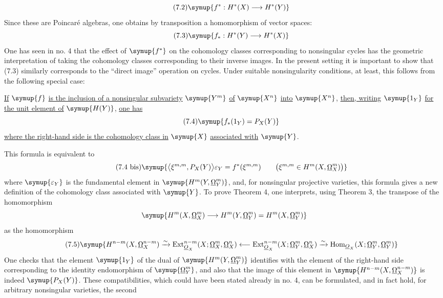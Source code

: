 \begin{equation}\tag{7.2}
  \symup{f^{*}:H^{*}(X)\longrightarrow H^{*}(Y)}
\end{equation}
Since these are Poincaré algebras, one obtains by transposition a homomorphism of vector
spaces:
\begin{equation}\tag{7.3}
  \symup{f_{*}:H^{*}(Y)\longrightarrow H^{*}(X)}
\end{equation}
One has seen in no. 4 that the effect of $\symup{f^{*}}$ on the cohomology classes
corresponding to nonsingular cycles has the geometric interpretation of taking
the cohomology classes corresponding to their inverse images. In the present
setting it is important to show that (7.3) similarly corresponds to the
``direct image'' operation on cycles. Under suitable nonsingularity conditions,
at least, this follows from the following special case:

 \uline{If} $\symup{f}$ \uline{is the inclusion of a nonsingular subvariety} $\symup{Y^{m}}$
\uline{of} $\symup{X^{n}}$ \uline{into} $\symup{X^{n}}$, \uline{then, writing} $\symup{1_Y}$ \uline{for the unit element of} $\symup{H(Y)}$,
\uline{one has}
\begin{equation}\tag{7.4}
  \symup{f_{*}(1_Y)=P_X(Y)}
\end{equation}
\uline{where the right-hand side is the cohomology class in} $\symup{X}$ \uline{associated with} $\symup{Y}$.

This formula is equivalent to
\begin{equation}\tag{7.4 bis}
  \symup{\bigl\langle\xi^{m,m},P_X(Y)\bigr\rangle\varepsilon_Y
  =f^{*}(\xi^{m,m})
  \qquad
  \bigl(\xi^{m,m}\in H^{m}(X,\underline{\Omega}_X^{m})\bigr)}
\end{equation}
 where $\symup{\varepsilon_Y}$ is
the fundamental element in $\symup{H^{m}(Y,\underline{\Omega}_Y^{m})}$, and, for nonsingular projective
varieties, this formula gives a new definition of the cohomology class associated with
$\symup{Y}$. To prove Theorem 4, one interprets, using Theorem 3, the transpose of the
homomorphism
\[
  \symup{H^{m}(X,\underline{\Omega}_X^{m})
  \longrightarrow H^{m}(Y,\underline{\Omega}_Y^{m})
  =H^{m}(X,\underline{\Omega}_Y^{m})}
\]
as the homomorphism
\begin{equation}\tag{7.5}
\symup{H^{n-m}(X,\underline{\Omega}_X^{n-m})
  \xrightarrow{\sim}
  \operatorname{Ext}_{\Osh_X}^{n-m}(X;\underline{\Omega}_X^{m},\underline{\Omega}_X^{n})
  \longleftarrow
  \operatorname{Ext}_{\Osh_X}^{n-m}(X;\underline{\Omega}_Y^{m},\underline{\Omega}_X^{n})
  \xrightarrow{\sim}
  \operatorname{Hom}_{\Osh_X}(X;\underline{\Omega}_Y^{m},\underline{\Omega}_Y^{m})}
\end{equation}
One checks that the element $\symup{1_Y}$ of the dual of
$\symup{H^{m}(Y,\underline{\Omega}_Y^{m})}$ identifies with the element of the right-hand side
corresponding to the identity endomorphism of $\symup{\underline{\Omega}_Y^{m}}$, and also that the
image of this element in $\symup{H^{n-m}(X,\underline{\Omega}_X^{n-m})}$ is indeed $\symup{P_X(Y)}$. These
compatibilities, which could have been stated already in no. 4, can be
formulated, and in fact hold, for arbitrary nonsingular varieties, the second

